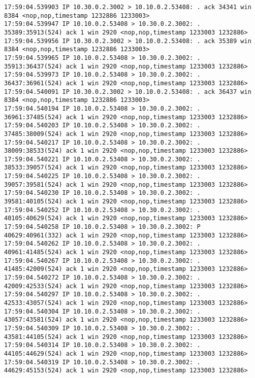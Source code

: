 \documentclass[a4paper,12pt]{article}
\begin{document}
\begin{Verbatim}
17:59:04.539903 IP 10.30.0.2.3002 > 10.10.0.2.53408: . ack 34341 win 8384 <nop,nop,timestamp 1232886 1233003>
17:59:04.539947 IP 10.10.0.2.53408 > 10.30.0.2.3002: . 35389:35913(524) ack 1 win 2920 <nop,nop,timestamp 1233003 1232886>
17:59:04.539956 IP 10.30.0.2.3002 > 10.10.0.2.53408: . ack 35389 win 8384 <nop,nop,timestamp 1232886 1233003>
17:59:04.539965 IP 10.10.0.2.53408 > 10.30.0.2.3002: . 35913:36437(524) ack 1 win 2920 <nop,nop,timestamp 1233003 1232886>
17:59:04.539973 IP 10.10.0.2.53408 > 10.30.0.2.3002: . 36437:36961(524) ack 1 win 2920 <nop,nop,timestamp 1233003 1232886>
17:59:04.540091 IP 10.30.0.2.3002 > 10.10.0.2.53408: . ack 36437 win 8384 <nop,nop,timestamp 1232886 1233003>
17:59:04.540194 IP 10.10.0.2.53408 > 10.30.0.2.3002: . 36961:37485(524) ack 1 win 2920 <nop,nop,timestamp 1233003 1232886>
17:59:04.540203 IP 10.10.0.2.53408 > 10.30.0.2.3002: . 37485:38009(524) ack 1 win 2920 <nop,nop,timestamp 1233003 1232886>
17:59:04.540217 IP 10.10.0.2.53408 > 10.30.0.2.3002: . 38009:38533(524) ack 1 win 2920 <nop,nop,timestamp 1233003 1232886>
17:59:04.540221 IP 10.10.0.2.53408 > 10.30.0.2.3002: . 38533:39057(524) ack 1 win 2920 <nop,nop,timestamp 1233003 1232886>
17:59:04.540225 IP 10.10.0.2.53408 > 10.30.0.2.3002: . 39057:39581(524) ack 1 win 2920 <nop,nop,timestamp 1233003 1232886>
17:59:04.540230 IP 10.10.0.2.53408 > 10.30.0.2.3002: . 39581:40105(524) ack 1 win 2920 <nop,nop,timestamp 1233003 1232886>
17:59:04.540252 IP 10.10.0.2.53408 > 10.30.0.2.3002: . 40105:40629(524) ack 1 win 2920 <nop,nop,timestamp 1233003 1232886>
17:59:04.540258 IP 10.10.0.2.53408 > 10.30.0.2.3002: P 40629:40961(332) ack 1 win 2920 <nop,nop,timestamp 1233003 1232886>
17:59:04.540262 IP 10.10.0.2.53408 > 10.30.0.2.3002: . 40961:41485(524) ack 1 win 2920 <nop,nop,timestamp 1233003 1232886>
17:59:04.540267 IP 10.10.0.2.53408 > 10.30.0.2.3002: . 41485:42009(524) ack 1 win 2920 <nop,nop,timestamp 1233003 1232886>
17:59:04.540272 IP 10.10.0.2.53408 > 10.30.0.2.3002: . 42009:42533(524) ack 1 win 2920 <nop,nop,timestamp 1233003 1232886>
17:59:04.540297 IP 10.10.0.2.53408 > 10.30.0.2.3002: . 42533:43057(524) ack 1 win 2920 <nop,nop,timestamp 1233003 1232886>
17:59:04.540304 IP 10.10.0.2.53408 > 10.30.0.2.3002: . 43057:43581(524) ack 1 win 2920 <nop,nop,timestamp 1233003 1232886>
17:59:04.540309 IP 10.10.0.2.53408 > 10.30.0.2.3002: . 43581:44105(524) ack 1 win 2920 <nop,nop,timestamp 1233003 1232886>
17:59:04.540314 IP 10.10.0.2.53408 > 10.30.0.2.3002: . 44105:44629(524) ack 1 win 2920 <nop,nop,timestamp 1233003 1232886>
17:59:04.540319 IP 10.10.0.2.53408 > 10.30.0.2.3002: . 44629:45153(524) ack 1 win 2920 <nop,nop,timestamp 1233003 1232886>

\end{Verbatim}
\end{document}
